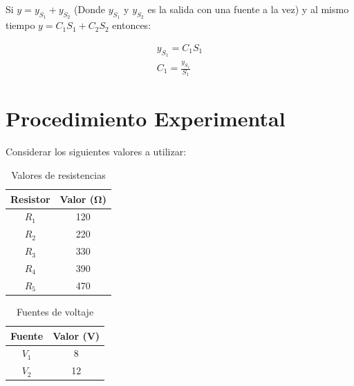 \documentclass{article}
\begin{document}
    Si $y = y_{S_1} + y_{S_2}$ (Donde $y_{S_1}$ y $y_{S_2}$ es la salida con una fuente a la vez) y al mismo tiempo $y = C_1S_1 + C_2S_2$ entonces:

    \begin{align*}
        y_{S_1} = C_1 S_1\\
        C_1 = \frac{y_{S_1}}{S_1}
    \end{align*}

    \section{Procedimiento Experimental}

    Considerar los siguientes valores a utilizar:

    \begin{table}[ht]
        \centering
        \begin{tabular}{|c|c|} %
            \midrule 
            Resistor    & Valor (\unit{\ohm})   \\
            \midrule
            $R_1$       & 120                   \\
            $R_2$       & 220                   \\
            $R_3$       & 330                   \\
            $R_4$       & 390                   \\
            $R_5$       & 470                   \\
            \midrule
        \end{tabular}
        \caption{Valores de resistencias}\label{tab:1}
    \end{table}

    \begin{table}[ht]
        \centering
        \begin{tabular}{|c|c|} %
            \midrule 
            Fuente      & Valor (\unit{\volt})  \\
            \midrule
            $V_1$       & 8                     \\
            $V_2$       & 12                    \\
            \midrule
        \end{tabular}
        \caption{Fuentes de voltaje}\label{tab:2}
    \end{table}
\end{document}
